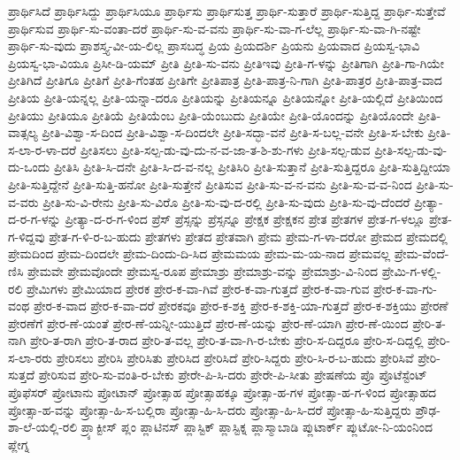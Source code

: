 {ಪ್ರಾರ್ಥಿಸಿದೆ
ಪ್ರಾರ್ಥಿಸಿದ್ದು
ಪ್ರಾರ್ಥಿಸಿಯೂ
ಪ್ರಾರ್ಥಿಸು
ಪ್ರಾರ್ಥಿಸುತ್ತ
ಪ್ರಾರ್ಥಿ-ಸುತ್ತಾರೆ
ಪ್ರಾರ್ಥಿ-ಸುತ್ತಿದ್ದ
ಪ್ರಾರ್ಥಿ-ಸುತ್ತೇವೆ
ಪ್ರಾರ್ಥಿಸುವ
ಪ್ರಾರ್ಥಿ-ಸು-ವಂತಾ-ದರೆ
ಪ್ರಾರ್ಥಿ-ಸು-ವ-ವನು
ಪ್ರಾರ್ಥಿ-ಸು-ವಾ-ಗ-ಲೆಲ್ಲ
ಪ್ರಾರ್ಥಿ-ಸು-ವಾ-ಗಿ-ನಷ್ಟೇ
ಪ್ರಾರ್ಥಿ-ಸು-ವುದು
ಪ್ರಾಶಸ್ತ್ಯ-ವೀ-ಯ-ಲಿಲ್ಲ
ಪ್ರಾಸಬದ್ಧ
ಪ್ರಿಯ
ಪ್ರಿಯದರ್ಶಿ
ಪ್ರಿಯನು
ಪ್ರಿಯವಾದ
ಪ್ರಿಯಸ್ವ-ಭಾವಿ
ಪ್ರಿಯಸ್ವ-ಭಾ-ವಿಯೂ
ಪ್ರಿಸೀ-ಡಿ-ಯಮ್
ಪ್ರೀತಿ
ಪ್ರೀತಿ-ಸು-ವನು
ಪ್ರೀತಿಇವು
ಪ್ರೀತಿ-ಗ-ಳನ್ನು
ಪ್ರೀತಿಗಾಗಿ
ಪ್ರೀತಿ-ಗಾ-ಗಿಯೇ
ಪ್ರೀತಿಗಿದೆ
ಪ್ರೀತಿಗೂ
ಪ್ರೀತಿಗೆ
ಪ್ರೀತಿ-ಗೆಂತಹ
ಪ್ರೀತಿಗೇ
ಪ್ರೀತಿಪಾತ್ರ
ಪ್ರೀತಿ-ಪಾತ್ರ-ನಿ-ಗಾಗಿ
ಪ್ರೀತಿ-ಪಾತ್ರರ
ಪ್ರೀತಿ-ಪಾತ್ರ-ವಾದ
ಪ್ರೀತಿಯ
ಪ್ರೀತಿ-ಯನ್ನಲ್ಲ
ಪ್ರೀತಿ-ಯನ್ನಾ-ದರೂ
ಪ್ರೀತಿಯನ್ನು
ಪ್ರೀತಿಯನ್ನೂ
ಪ್ರೀತಿಯನ್ನೋ
ಪ್ರೀತಿ-ಯಲ್ಲಿದೆ
ಪ್ರೀತಿಯಿಂದ
ಪ್ರೀತಿಯು
ಪ್ರೀತಿಯೂ
ಪ್ರೀತಿಯೆ
ಪ್ರೀತಿಯೆಂಬ
ಪ್ರೀತಿ-ಯೆಂಬುದು
ಪ್ರೀತಿಯೇ
ಪ್ರೀತಿ-ಯೊಂದನ್ನು
ಪ್ರೀತಿಯೊಂದೇ
ಪ್ರೀತಿ-ವಾತ್ಸಲ್ಯ
ಪ್ರೀತಿ-ವಿಶ್ವಾ-ಸ-ದಿಂದ
ಪ್ರೀತಿ-ವಿಶ್ವಾ-ಸ-ದಿಂದಲೇ
ಪ್ರೀತಿ-ಸದ್ಭಾ-ವನೆ
ಪ್ರೀತಿ-ಸ-ಬಲ್ಲ-ವನೇ
ಪ್ರೀತಿ-ಸ-ಬೇಕು
ಪ್ರೀತಿ-ಸ-ಲಾ-ರ-ಳಾ-ದರೆ
ಪ್ರೀತಿಸಲು
ಪ್ರೀತಿ-ಸಲ್ಪ-ಡು-ವು-ದು-ನ-ವ-ಜಾ-ತ-ಶಿ-ಶು-ಗಳು
ಪ್ರೀತಿ-ಸಲ್ಪ-ಡುವ
ಪ್ರೀತಿ-ಸಲ್ಪ-ಡು-ವು-ದು-ಒಂದು
ಪ್ರೀತಿಸಿ
ಪ್ರೀತಿ-ಸಿ-ದನೇ
ಪ್ರೀತಿ-ಸಿ-ದ-ವ-ನಲ್ಲ
ಪ್ರೀತಿಸಿರಿ
ಪ್ರೀತಿ-ಸುತ್ತಾನೆ
ಪ್ರೀತಿ-ಸುತ್ತಿದ್ದರೂ
ಪ್ರೀತಿ-ಸುತ್ತಿದ್ದೀಯಾ
ಪ್ರೀತಿ-ಸುತ್ತಿದ್ದೇನೆ
ಪ್ರೀತಿ-ಸುತ್ತಿ-ಹನೋ
ಪ್ರೀತಿ-ಸುತ್ತೇನೆ
ಪ್ರೀತಿಸುವ
ಪ್ರೀತಿ-ಸು-ವ-ನ-ವನು
ಪ್ರೀತಿ-ಸು-ವ-ವ-ನಿಂದ
ಪ್ರೀತಿ-ಸು-ವ-ವರು
ಪ್ರೀತಿ-ಸು-ವಿ-ರೇನು
ಪ್ರೀತಿ-ಸು-ವಿರೊ
ಪ್ರೀತಿ-ಸು-ವು-ದ-ರಲ್ಲಿ
ಪ್ರೀತಿ-ಸು-ವುದು
ಪ್ರೀತಿ-ಸು-ವು-ದೆಂದರೆ
ಪ್ರೀತ್ಯಾ-ದ-ರ-ಗ-ಳನ್ನು
ಪ್ರೀತ್ಯಾ-ದ-ರ-ಗ-ಳಿಂದ
ಪ್ರೆಸ್
ಪ್ರೆಸ್ಸನ್ನು
ಪ್ರೆಸ್ಸನ್ನೂ
ಪ್ರೇಕ್ಷಕ
ಪ್ರೇಕ್ಷಕನ
ಪ್ರೇತ
ಪ್ರೇತಗಳ
ಪ್ರೇತ-ಗ-ಳಲ್ಲೂ
ಪ್ರೇತ-ಗ-ಳಿದ್ದವು
ಪ್ರೇತ-ಗ-ಳಿ-ರ-ಬ-ಹುದು
ಪ್ರೇತಗಳು
ಪ್ರೇತದ
ಪ್ರೇತವಾಗಿ
ಪ್ರೇಮ
ಪ್ರೇಮ-ಗ-ಳಾ-ದರೋ
ಪ್ರೇಮದ
ಪ್ರೇಮದಲ್ಲಿ
ಪ್ರೇಮದಿಂದ
ಪ್ರೇಮ-ದಿಂದಲೇ
ಪ್ರೇಮ-ದಿಂದು-ದಿ-ಸಿದ
ಪ್ರೇಮಮಯ
ಪ್ರೇಮ-ಮ-ಯ-ನಾದ
ಪ್ರೇಮವಲ್ಲ
ಪ್ರೇಮ-ವೆಂದೆ-ಣಿಸಿ
ಪ್ರೇಮವೇ
ಪ್ರೇಮವೊಂದೇ
ಪ್ರೇಮಸ್ವ-ರೂಪ
ಪ್ರೇಮಾಶ್ರು
ಪ್ರೇಮಾಶ್ರು-ವನ್ನು
ಪ್ರೇಮಾಶ್ರು-ವಿ-ನಿಂದ
ಪ್ರೇಮಿ-ಗ-ಳಲ್ಲಿ-ರಲಿ
ಪ್ರೇಮಿಗಳು
ಪ್ರೇಮಿಯಾದ
ಪ್ರೇರಕ
ಪ್ರೇರ-ಕ-ವಾ-ಗಿವೆ
ಪ್ರೇರ-ಕ-ವಾ-ಗುತ್ತದೆ
ಪ್ರೇರ-ಕ-ವಾ-ಗುವ
ಪ್ರೇರ-ಕ-ವಾ-ಗು-ವಂಥ
ಪ್ರೇರ-ಕ-ವಾದ
ಪ್ರೇರ-ಕ-ವಾ-ದರೆ
ಪ್ರೇರಕವೂ
ಪ್ರೇರ-ಕ-ಶಕ್ತಿ
ಪ್ರೇರ-ಕ-ಶಕ್ತಿ-ಯಾ-ಗುತ್ತದೆ
ಪ್ರೇರ-ಕ-ಶಕ್ತಿಯು
ಪ್ರೇರಣೆ
ಪ್ರೇರಣೆಗೆ
ಪ್ರೇರ-ಣೆ-ಯಂತೆ
ಪ್ರೇರ-ಣೆ-ಯನ್ನೀ-ಯುತ್ತಿದೆ
ಪ್ರೇರ-ಣೆ-ಯನ್ನು
ಪ್ರೇರ-ಣೆ-ಯಾಗಿ
ಪ್ರೇರ-ಣೆ-ಯಿಂದ
ಪ್ರೇರಿ-ತ-ನಾಗಿ
ಪ್ರೇರಿ-ತ-ರಾಗಿ
ಪ್ರೇರಿ-ತ-ರಾದ
ಪ್ರೇರಿ-ತ-ವಲ್ಲ
ಪ್ರೇರಿ-ತ-ವಾ-ಗಿ-ರ-ಬೇಕು
ಪ್ರೇರಿ-ಸ-ದಿದ್ದರೂ
ಪ್ರೇರಿ-ಸ-ದಿದ್ದಲ್ಲಿ
ಪ್ರೇರಿ-ಸ-ಲಾ-ರರು
ಪ್ರೇರಿಸಲು
ಪ್ರೇರಿಸಿ
ಪ್ರೇರಿಸಿತು
ಪ್ರೇರಿಸಿದ
ಪ್ರೇರಿಸಿದೆ
ಪ್ರೇರಿ-ಸಿದ್ದರು
ಪ್ರೇರಿ-ಸಿ-ರ-ಬ-ಹುದು
ಪ್ರೇರಿಸಿವೆ
ಪ್ರೇರಿ-ಸುತ್ತದೆ
ಪ್ರೇರಿಸುವ
ಪ್ರೇರಿ-ಸು-ವಂತಿ-ರ-ಬೇಕು
ಪ್ರೇರೇ-ಪಿ-ಸಿ-ದರು
ಪ್ರೇರೇ-ಪಿ-ಸೀತು
ಪ್ರೇಷಣೆಯ
ಪ್ರೊ
ಪ್ರೊಟೆಸ್ಟೆಂಟ್
ಪ್ರೊಫೆಸರ್
ಪ್ರೋಟಾನು
ಪ್ರೋಟಾನ್
ಪ್ರೋತ್ಸಾಹ
ಪ್ರೋತ್ಸಾಹಕ್ಕೂ
ಪ್ರೋತ್ಸಾ-ಹ-ಗಳ
ಪ್ರೋತ್ಸಾ-ಹ-ಗ-ಳಿಂದ
ಪ್ರೋತ್ಸಾಹದ
ಪ್ರೋತ್ಸಾ-ಹ-ವನ್ನು
ಪ್ರೋತ್ಸಾ-ಹಿ-ಸ-ಬಲ್ಲಿರಾ
ಪ್ರೋತ್ಸಾ-ಹಿ-ಸಿ-ದರು
ಪ್ರೋತ್ಸಾ-ಹಿ-ಸಿ-ದರೆ
ಪ್ರೋತ್ಸಾ-ಹಿ-ಸುತ್ತಿದ್ದರು
ಪ್ರೌಢ-ಶಾ-ಲೆ-ಯಲ್ಲಿ-ರಲಿ
ಪ್ರ್ಯಾಕ್ಟೀಸ್
ಪ್ಲಂ
ಪ್ಲಾಟಿನಸ್
ಪ್ಲಾಸ್ಟಿಕ್
ಪ್ಲಾಸ್ಟಿಕ್ನ
ಪ್ಲಾಸ್ಮಾಬಾಡಿ
ಪ್ಲುಟಾರ್ಕ್
ಪ್ಲುಟೋ-ನಿ-ಯಂನಿಂದ
ಪ್ಲೇಗ್ನ
}
